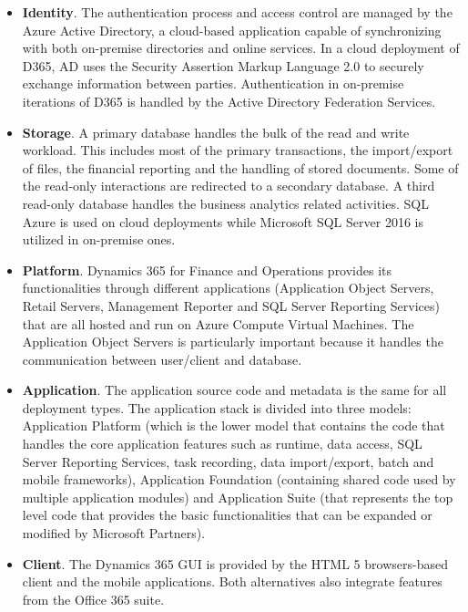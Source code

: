 \begin{itemize}
    \item \textbf{Identity}. The authentication process and access control are managed by the Azure Active Directory, a cloud-based application capable of synchronizing with both on-premise directories and online services. In a cloud deployment of D365, AD uses the Security Assertion Markup Language 2.0 to securely exchange information between parties. Authentication in on-premise iterations of D365 is handled by the Active Directory Federation Services.
    
    \item \textbf{Storage}. A primary database handles the bulk of the read and write workload. This includes most of the primary transactions, the import/export of files, the financial reporting and the handling of stored documents. Some of the read-only interactions are redirected to a secondary database. A third read-only database handles the business analytics related activities. SQL Azure is used on cloud deployments while Microsoft SQL Server 2016 is utilized in on-premise ones.
    
    \item \textbf{Platform}. Dynamics 365 for Finance and Operations provides its functionalities through different applications (Application Object Servers, Retail Servers, Management Reporter and SQL Server Reporting Services) that are all hosted and run on Azure Compute Virtual Machines. The Application Object Servers is particularly important because it handles the communication between user/client and database.
    
    \item \textbf{Application}. The application source code and metadata is the same for all deployment types. The application stack is divided into three models: Application Platform (which is the lower model that contains the code that handles the core application features such as runtime, data access, SQL Server Reporting Services, task recording, data import/export, batch and mobile frameworks), Application Foundation (containing shared code used by multiple application modules) and Application Suite (that represents the top level code that provides the basic functionalities that can be expanded or modified by Microsoft Partners).
        
    \item \textbf{Client}. The Dynamics 365 GUI is provided by the HTML 5 browsers-based client and the mobile applications. Both alternatives also integrate features from the Office 365 suite.
    

\end{itemize}
